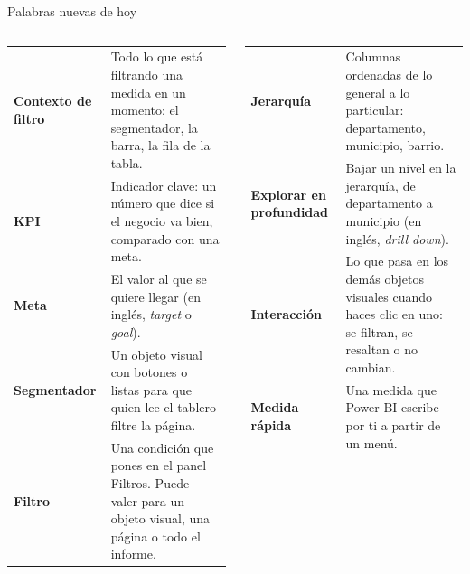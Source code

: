 \documentclass[aspectratio=169,11pt]{beamer}
\begin{document}
\begin{frame}[t]{Palabras nuevas de hoy}
  \scriptsize
  \renewcommand{\arraystretch}{1.12}
  \begin{columns}[T,onlytextwidth]
    \begin{tabular}{@{}L{1.9cm}L{4.45cm}@{}}
      \toprule
      \textbf{Contexto de filtro} & Todo lo que está filtrando una medida en un momento: el segmentador, la barra, la fila de la tabla. \\
      \textbf{KPI} & Indicador clave: un número que dice si el negocio va bien, comparado con una meta. \\
      \textbf{Meta} & El valor al que se quiere llegar (en inglés, \textit{target} o \textit{goal}). \\
      \textbf{Segmentador} & Un objeto visual con botones o listas para que quien lee el tablero filtre la página. \\
      \textbf{Filtro} & Una condición que pones en el panel Filtros. Puede valer para un objeto visual, una página o todo el informe. \\
      \bottomrule
    \end{tabular}
    \begin{tabular}{@{}L{1.9cm}L{4.45cm}@{}}
      \toprule
      \textbf{Jerarquía} & Columnas ordenadas de lo general a lo particular: departamento, municipio, barrio. \\
      \textbf{Explorar en profundidad} & Bajar un nivel en la jerarquía, de departamento a municipio (en inglés, \textit{drill down}). \\
      \textbf{Interacción} & Lo que pasa en los demás objetos visuales cuando haces clic en uno: se filtran, se resaltan o no cambian. \\
      \textbf{Medida rápida} & Una medida que Power BI escribe por ti a partir de un menú. \\
      \bottomrule
    \end{tabular}
  \end{columns}
\end{frame}

\end{document}
